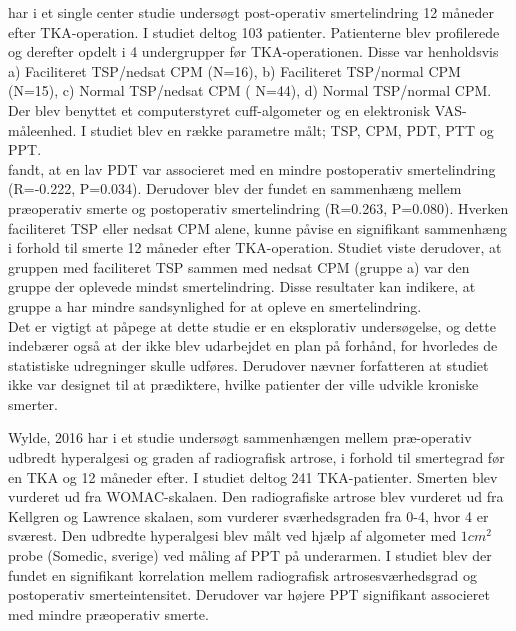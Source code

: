  har i et single center  studie undersøgt post-operativ smertelindring 12 måneder efter TKA-operation. I studiet deltog 103 patienter. Patienterne blev profilerede og derefter opdelt i 4 undergrupper før TKA-operationen. Disse var henholdsvis a)  Faciliteret TSP/nedsat CPM (N=16), b) Faciliteret TSP/normal CPM (N=15), c)  Normal TSP/nedsat CPM ( N=44), d) Normal TSP/normal CPM. Der blev benyttet et computerstyret cuff-algometer og en elektronisk VAS-måleenhed. I studiet blev en række parametre målt; TSP, CPM, PDT, PTT og PPT. \\
 fandt, at en lav PDT var associeret med en mindre postoperativ smertelindring (R=-0.222, P=0.034). Derudover blev der fundet en sammenhæng mellem præoperativ smerte og postoperativ smertelindring (R=0.263, P=0.080).
Hverken faciliteret TSP eller nedsat CPM alene, kunne påvise en signifikant sammenhæng i forhold til smerte 12 måneder efter TKA-operation. Studiet viste derudover, at gruppen med faciliteret TSP sammen med nedsat CPM (gruppe a) var den gruppe der oplevede mindst smertelindring.
Disse resultater kan indikere, at gruppe a har mindre sandsynlighed for at opleve en smertelindring.\\
Det er vigtigt at påpege at dette studie er en eksplorativ undersøgelse, og dette indebærer også at der ikke blev udarbejdet en plan på forhånd, for hvorledes de statistiske udregninger skulle udføres.
Derudover nævner forfatteren at studiet ikke var designet til at prædiktere, hvilke patienter der ville udvikle kroniske smerter. \citep{Petersen2016}

Wylde, 2016 har i et studie undersøgt sammenhængen mellem præ-operativ udbredt hyperalgesi og graden af radiografisk artrose, i forhold til smertegrad før en TKA og 12 måneder efter. I studiet deltog 241 TKA-patienter. Smerten blev vurderet ud fra WOMAC-skalaen. Den radiografiske artrose blev vurderet ud fra Kellgren og Lawrence skalaen, som vurderer sværhedsgraden fra 0-4, hvor 4 er sværest. Den udbredte hyperalgesi blev målt ved hjælp af algometer med $1 cm^{2}$ probe (Somedic, sverige) ved måling af PPT på underarmen.
I studiet blev der fundet en signifikant korrelation mellem radiografisk artrosesværhedsgrad og postoperativ smerteintensitet. Derudover var højere PPT signifikant associeret med mindre præoperativ smerte.	

